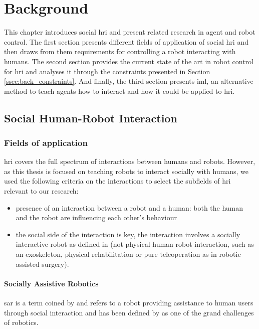 \chapter{Background} \label{chap:background}

This chapter introduces social \gls{hri} and present related research in agent and robot control. The first section presents different fields of application of social \gls{hri} and then draws from them requirements for controlling a robot interacting with humans.  The second section provides the current state of the art in robot control for \gls{hri} and analyses it through the constraints presented in Section \ref{ssec:back_constraints}. And finally, the third section presents \acrlong{iml}, an alternative method to teach agents how to interact and how it could be applied to \gls{hri}.

\section{Social Human-Robot Interaction}

\subsection{Fields of application}

\acrlong{hri} covers the full spectrum of interactions between humans and robots. However, as this thesis is focused on teaching robots to interact socially with humans, we used the following criteria on the interactions to select the subfields of \gls{hri} relevant to our research:
\begin{itemize}
\item presence of an interaction between a robot and a human: both the human and the robot are influencing each other's behaviour
\item the social side of the interaction is key, the interaction involves a socially interactive robot as defined in \citet{Fong2003} (not physical human-robot interaction, such as an exoskeleton, physical rehabilitation or pure teleoperation as in robotic assisted surgery).
\end{itemize}

\subsubsection{Socially Assistive Robotics}

	\gls{sar} is a term coined by \cite{feil2005defining} and refers to a robot providing assistance to human users through social interaction and has been defined by \cite{tapus2007socially} as one of the grand challenges of robotics.
	

